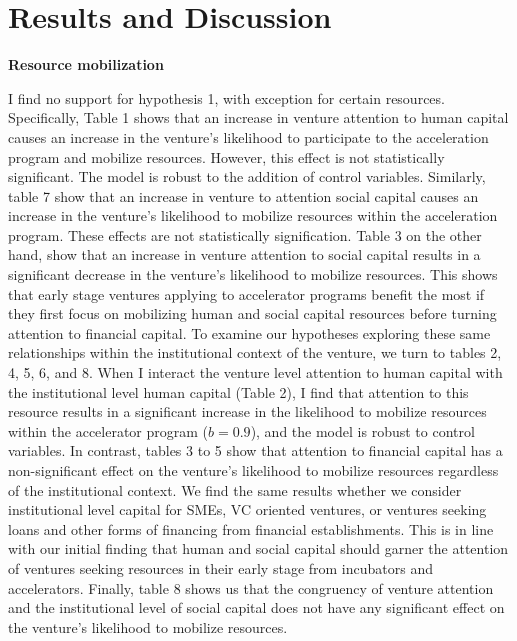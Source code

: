 \documentclass[
  english,
  man]{apa6}
\begin{document}
\hypertarget{results-and-discussion}{%
\section{Results and Discussion}\label{results-and-discussion}}

\textbf{Resource mobilization}

I find no support for hypothesis 1, with exception for certain resources. Specifically, Table 1 shows that an increase in venture attention to human capital causes an increase in the venture's likelihood to participate to the acceleration program and mobilize resources. However, this effect is not statistically significant. The model is robust to the addition of control variables. Similarly, table 7 show that an increase in venture to attention social capital causes an increase in the venture's likelihood to mobilize resources within the acceleration program. These effects are not statistically signification. Table 3 on the other hand, show that an increase in venture attention to social capital results in a significant decrease in the venture's likelihood to mobilize resources. This shows that early stage ventures applying to accelerator programs benefit the most if they first focus on mobilizing human and social capital resources before turning attention to financial capital. To examine our hypotheses exploring these same relationships within the institutional context of the venture, we turn to tables 2, 4, 5, 6, and 8. When I interact the venture level attention to human capital with the institutional level human capital (Table 2), I find that attention to this resource results in a significant increase in the likelihood to mobilize resources within the accelerator program (\(b = 0.9\)), and the model is robust to control variables. In contrast, tables 3 to 5 show that attention to financial capital has a non-significant effect on the venture's likelihood to mobilize resources regardless of the institutional context. We find the same results whether we consider institutional level capital for SMEs, VC oriented ventures, or ventures seeking loans and other forms of financing from financial establishments. This is in line with our initial finding that human and social capital should garner the attention of ventures seeking resources in their early stage from incubators and accelerators. Finally, table 8 shows us that the congruency of venture attention and the institutional level of social capital does not have any significant effect on the venture's likelihood to mobilize resources.
\end{document}
